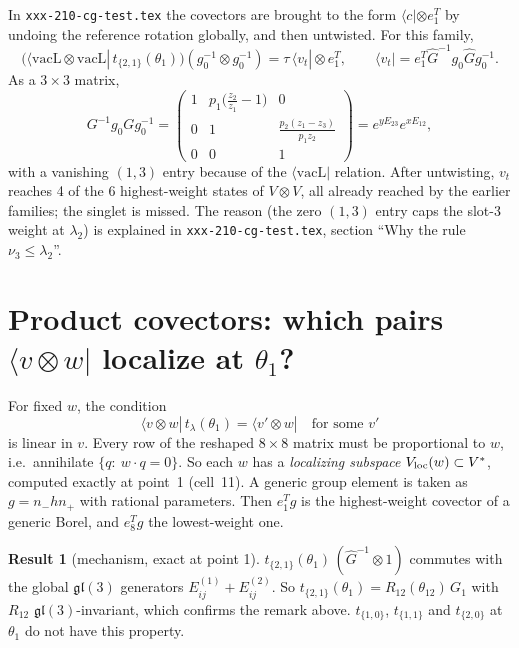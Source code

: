 \documentclass[11pt]{article}
\newcommand{\vacL}{\langle\mathrm{vacL}|}
\newcommand{\nb}[1]{\texttt{#1}}
\theoremstyle{definition}
\newtheorem{result}{Result}
\theoremstyle{remark}
\begin{document}
In \nb{xxx-210-cg-test.tex} the covectors are brought to the form $\langle c|\otimes e_1^T$ by undoing the reference rotation globally, and then untwisted. For this family,
\begin{equation}
\big(\langle \mathrm{vacL}\otimes\mathrm{vacL}|\,t_{\{2,1\}}(\theta_1)\big)(g_0^{-1}\otimes g_0^{-1})=\tau\,\langle v_t|\otimes e_1^T,\qquad
\langle v_t|=e_1^T\hat G^{-1}g_0\hat G g_0^{-1}.
\end{equation}
As a $3\times3$ matrix,
\begin{equation}
G^{-1}g_0Gg_0^{-1}=\begin{pmatrix}1& p_1\big(\tfrac{z_2}{z_1}-1\big)&0\\0&1&\tfrac{p_2(z_1-z_3)}{p_1z_2}\\0&0&1\end{pmatrix}=e^{yE_{23}}e^{xE_{12}},
\end{equation}
with a vanishing $(1,3)$ entry because of the $\vacL$ relation. After untwisting, $v_t$ reaches 4 of the 6 highest-weight states of $V\otimes V$, all already reached by the earlier families; the singlet is missed. The reason (the zero $(1,3)$ entry caps the slot-3 weight at $\lambda_2$) is explained in \nb{xxx-210-cg-test.tex}, section ``Why the rule $\nu_3\le\lambda_2$''.

\section{Product covectors: which pairs $\langle v\otimes w|$ localize at $\theta_1$?}\label{sec:pairs}

For fixed $w$, the condition
\begin{equation}
\langle v\otimes w|\,t_\lambda(\theta_1)=\langle v'\otimes w|\quad\text{for some }v'
\end{equation}
is linear in $v$. Every row of the reshaped $8\times8$ matrix must be proportional to $w$, i.e.\ annihilate $\{q:\ w\cdot q=0\}$. So each $w$ has a \emph{localizing subspace} $V_{\rm loc}(w)\subset V^*$, computed exactly at point~1 (cell~11). A generic group element is taken as $g=n_-hn_+$ with rational parameters. Then $e_1^Tg$ is the highest-weight covector of a generic Borel, and $e_8^Tg$ the lowest-weight one.

\begin{result}[mechanism, exact at point 1]\label{res:R}
$t_{\{2,1\}}(\theta_1)\,(\hat G^{-1}\otimes1)$ commutes with the global $\mathfrak{gl}(3)$ generators $E^{(1)}_{ij}+E^{(2)}_{ij}$. So $t_{\{2,1\}}(\theta_1)=R_{12}(\theta_{12})\,G_1$ with $R_{12}$ $\mathfrak{gl}(3)$-invariant, which confirms the remark above. $t_{\{1,0\}}$, $t_{\{1,1\}}$ and $t_{\{2,0\}}$ at $\theta_1$ do not have this property.
\end{result}
\end{document}
